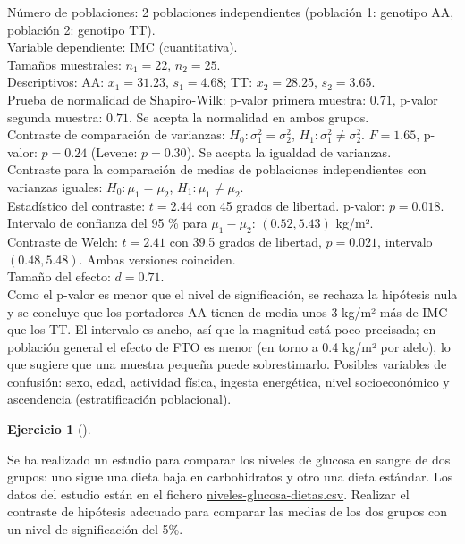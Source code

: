\documentclass[
  spanish,
  a4paper,
]{scrreport}
\theoremstyle{definition}
\newtheorem{exercise}{Ejercicio}[chapter]
\theoremstyle{remark}
\begin{document}
\begin{tcolorbox}
Número de poblaciones: 2 poblaciones independientes (población 1:
genotipo AA, población 2: genotipo TT).\\
Variable dependiente: IMC (cuantitativa).\\
Tamaños muestrales: \(n_1=22\), \(n_2=25\).\\
Descriptivos: AA: \(\bar x_1=31.23\), \(s_1=4.68\); TT:
\(\bar x_2=28.25\), \(s_2=3.65\).\\
Prueba de normalidad de Shapiro-Wilk: p-valor primera muestra: \(0.71\),
p-valor segunda muestra: \(0.71\). Se acepta la normalidad en ambos
grupos.\\
Contraste de comparación de varianzas: \(H_0:\sigma_1^2=\sigma_2^2\),
\(H_1:\sigma_1^2\neq \sigma_2^2\). \(F=1.65\), p-valor: \(p=0.24\)
(Levene: \(p=0.30\)). Se acepta la igualdad de varianzas.\\
Contraste para la comparación de medias de poblaciones independientes
con varianzas iguales: \(H_0:\mu_1=\mu_2\), \(H_1:\mu_1\neq\mu_2\).\\
Estadístico del contraste: \(t=2.44\) con 45 grados de libertad.
p-valor: \(p=0.018\). Intervalo de confianza del 95 \% para
\(\mu_1-\mu_2\): \((0.52, 5.43)\) kg/m².\\
Contraste de Welch: \(t=2.41\) con 39.5 grados de libertad, \(p=0.021\),
intervalo \((0.48, 5.48)\). Ambas versiones coinciden.\\
Tamaño del efecto: \(d=0.71\).\\
Como el p-valor es menor que el nivel de significación, se rechaza la
hipótesis nula y se concluye que los portadores AA tienen de media unos
3 kg/m² más de IMC que los TT. El intervalo es ancho, así que la
magnitud está poco precisada; en población general el efecto de FTO es
menor (en torno a 0.4 kg/m² por alelo), lo que sugiere que una muestra
pequeña puede sobrestimarlo. Posibles variables de confusión: sexo,
edad, actividad física, ingesta energética, nivel socioeconómico y
ascendencia (estratificación poblacional).

\end{tcolorbox}

\begin{exercise}[]\protect\hypertarget{exr-contraste-comparacion-medias-glucosa}{}\label{exr-contraste-comparacion-medias-glucosa}

Se ha realizado un estudio para comparar los niveles de glucosa en
sangre de dos grupos: uno sigue una dieta baja en carbohidratos y otro
una dieta estándar. Los datos del estudio están en el fichero
\href{datos/niveles-glucosa-dietas.csv}{niveles-glucosa-dietas.csv}.
Realizar el contraste de hipótesis adecuado para comparar las medias de
los dos grupos con un nivel de significación del 5\%.

\end{exercise}
\end{document}
